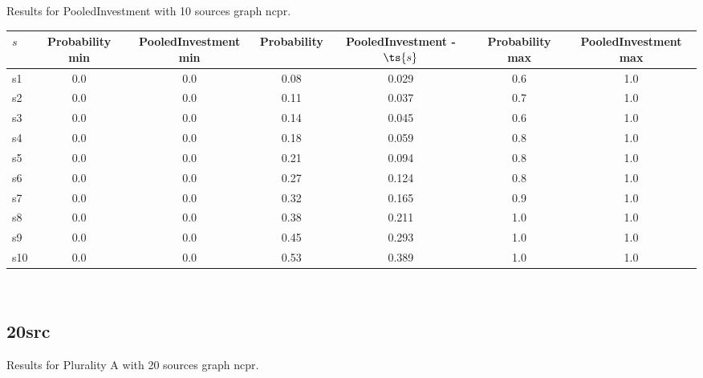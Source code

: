 \documentclass{article}
\begin{document}
\noindent Results for PooledInvestment with 10 sources graph ncpr.

\noindent\begin{tabular}{|l|c|c|c|c|c|c|}
\hline
$s$& Probability min & PooledInvestment min & Probability & PooledInvestment - $\ts{s}$ & Probability max & PooledInvestment max\\
\hline
s1 &0.0 & 0.0 & 0.08 & 0.029 & 0.6 & 1.0\\
\hline
s2 &0.0 & 0.0 & 0.11 & 0.037 & 0.7 & 1.0\\
\hline
s3 &0.0 & 0.0 & 0.14 & 0.045 & 0.6 & 1.0\\
\hline
s4 &0.0 & 0.0 & 0.18 & 0.059 & 0.8 & 1.0\\
\hline
s5 &0.0 & 0.0 & 0.21 & 0.094 & 0.8 & 1.0\\
\hline
s6 &0.0 & 0.0 & 0.27 & 0.124 & 0.8 & 1.0\\
\hline
s7 &0.0 & 0.0 & 0.32 & 0.165 & 0.9 & 1.0\\
\hline
s8 &0.0 & 0.0 & 0.38 & 0.211 & 1.0 & 1.0\\
\hline
s9 &0.0 & 0.0 & 0.45 & 0.293 & 1.0 & 1.0\\
\hline
s10 &0.0 & 0.0 & 0.53 & 0.389 & 1.0 & 1.0\\
\hline
\end{tabular}\\

\newpage

\subsection{20src}

\noindent Results for Plurality A with 20 sources graph ncpr.
\end{document}
